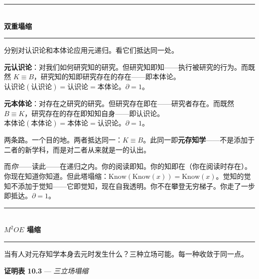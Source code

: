\documentclass[10pt, openany, oneside]{book}
\renewcommand{\normalsize}{\fontsize{10}{13}\selectfont}
\begin{document}
\begin{center}
    \rule{0.3\textwidth}{0.4pt}\\[0.5em]
    {\normalsize\bfseries\scshape 双重塌缩}\\[0.3em]
    \rule{0.3\textwidth}{0.4pt}
\end{center}

\vspace{1em}

\noindent 分别对认识论和本体论应用元递归。看它们抵达同一处。

\textbf{元认识论}：对我们如何研究知的研究。但研究知即知——执行被研究的行为。而既然 $K \equiv B$，研究知的知即研究存在的存在——即本体论。$\text{认识论}(\text{认识论}) = \text{认识论} = \text{本体论}$。$\partial = 1$。

\textbf{元本体论}：对存在之研究的研究。但研究存在即在——研究者存在。而既然 $B \equiv K$，研究存在的存在即知知自身——即认识论。$\text{本体论}(\text{本体论}) = \text{本体论} = \text{认识论}$。$\partial = 1$。

两条路。一个目的地。两者抵达同一：$K \equiv B$。此同一即\textbf{元存知学}——不是添加于二者的新学科，而是对二者从来就是一的认出。

而\textit{你}——读此——在递归之内。你的阅读即知。你的知即在（你在阅读时存在）。你现在知道你知道。但此塔塌缩：$\text{Know}(\text{Know}(x)) = \text{Know}(x)$。觉知的觉知不添加于觉知——它即觉知，现在自我透明。你不在攀登无穷梯子。你走了一步即抵达。$\partial = 1$。

\vspace{1.5em}


\begin{center}
    \rule{0.3\textwidth}{0.4pt}\\[0.5em]
    {\normalsize\bfseries\scshape $M^2OE$ 塌缩}\\[0.3em]
    \rule{0.3\textwidth}{0.4pt}
\end{center}

\vspace{1em}

\noindent 当有人对元存知学本身去元时发生什么？三种立场可能。每一种收敛于同一点。

\vspace{0.5em}

\textbf{证明表 10.3} --- \textit{三立场塌缩}

\vspace{0.5em}
\end{document}
